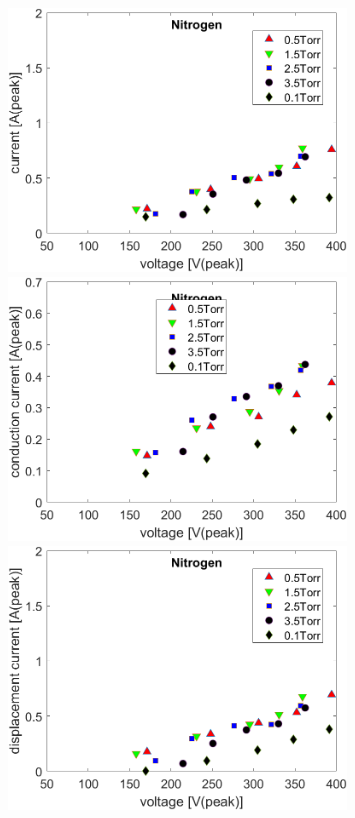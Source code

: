 \documentclass[12pt]{iopart}
\begin{document}
\begin{figure}[ht!]
\begin{center}
\begin{minipage}{0.495\textwidth}
\end{minipage}
\begin{minipage}{0.495\textwidth}
    \includegraphics[width=0.8\textwidth]{N2current_volts.png}
\end{minipage}
\begin{minipage}{0.495\textwidth}
    \includegraphics[width=0.8\textwidth]{N2conduction_volts.png}
\end{minipage}
\begin{minipage}{0.495\textwidth}
    \includegraphics[width=0.8\textwidth]{N2disp_volts.png}

\end{minipage}
\end{center}
\end{figure}
\end{document}
